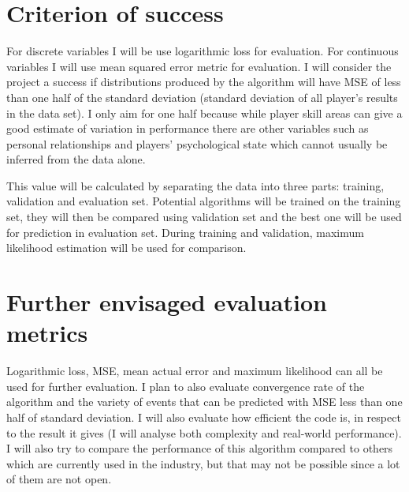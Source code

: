 \documentclass[12pt,a4paper]{article}
\begin{document}
\section{Criterion of success}
For discrete variables I will be use logarithmic loss for evaluation. For continuous variables I will use mean squared error metric for evaluation. I will consider the project a success if distributions produced by the algorithm will have MSE of less than one half of the standard deviation (standard deviation of all player's results in the data set). I only aim for one half because while player skill areas can give a good estimate of variation in performance there are other variables such as personal relationships and players' psychological state which cannot usually be inferred from the data alone. 

This value will be calculated by separating the data into three parts: training, validation and evaluation set. Potential algorithms will be trained on the training set, they will then be compared using validation set and the best one will be used for prediction in evaluation set. During training and validation, maximum likelihood estimation will be used for comparison.

\section{Further envisaged evaluation metrics}
Logarithmic loss, MSE, mean actual error and maximum likelihood can all be used for further evaluation. I plan to also evaluate convergence rate of the algorithm and the variety of events that can be predicted with MSE less than one half of standard deviation. I will also evaluate how efficient the code is, in respect to the result it gives (I will analyse both complexity and real-world performance). I will also try to compare the performance of this algorithm compared to others which are currently used in the industry, but that may not be possible since a lot of them are not open.
\end{document}
